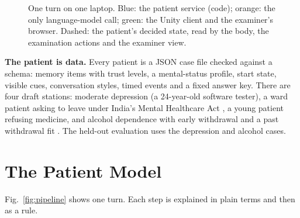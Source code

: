 \documentclass[sn-basic,Numbered]{sn-jnl}
\begin{document}
\begin{figure}[t]
\centering
{}
\caption{One turn on one laptop. Blue: the patient service (code); orange: the only language-model call; green: the Unity client and the
examiner's browser. Dashed: the patient's decided state, read by the body, the examination actions and the examiner view.}
\label{fig:arch}
\end{figure}

\textbf{The patient is data.} Every patient is a JSON case file checked against a schema: memory items with trust levels, a mental-status
profile, start state, visible cues, conversation styles, timed events and a fixed answer key. There are four draft stations: moderate depression (a 24-year-old software
tester), a ward patient asking to leave under India's Mental Healthcare Act \cite{mhca2017}, a young patient refusing medicine, and alcohol
dependence with early withdrawal and a past withdrawal fit \cite{nice2010cg100}. The held-out evaluation uses the depression and alcohol cases.

\section{The Patient Model}\label{sec:model}
Fig.~\ref{fig:pipeline} shows one turn. Each step is explained in plain terms and then as a rule.
\end{document}
